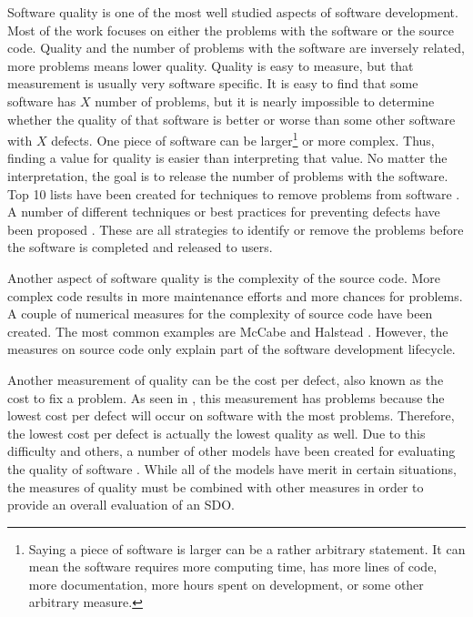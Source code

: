 \documentclass[SDSUThesis.tex]{subfiles}
\begin{document}
    Software quality is one of the most well studied aspects
    of software development.  Most of the work focuses on
    either the problems with the software or the source code.
    Quality and the number of problems with the software
    are inversely related, more problems means lower quality. 
    Quality is easy to measure, but 
    that measurement is usually very software specific.  It is easy
    to find that some software has $X$ number of problems, but
    it is nearly impossible to determine whether the quality
    of that software is better or worse than some other software
    with $X$ defects.  One piece of software can be 
    larger\footnote{Saying a piece of software is larger can be a 
    rather arbitrary statement.  It can mean the software requires 
    more computing time, has more lines of code, more documentation, 
    more hours spent on development, or some other arbitrary measure.}
    or more complex.  Thus, finding a value for quality is easier 
    than interpreting that value.  No matter the interpretation,
    the goal is to release the number of problems with the software.
    Top 10 lists have been created for techniques to remove problems
    from software \cite{Boehm2001}.  
    A number of different techniques or best practices
    for preventing defects have 
    been proposed \cite{Faizan2012}.  These are all strategies to identify
    or remove the problems before the software is completed and released
    to users.  
    
    Another aspect of software quality is the complexity of the 
    source code.  More complex code results in more maintenance efforts and
    more chances for problems. A couple of numerical measures for the 
    complexity of source code have been created.  The most common examples
    are McCabe \cite{McCabe1976} and Halstead \cite{Halstead1977}.
    However, the measures on source code only explain part of the 
    software development lifecycle.  
    
    Another measurement of quality can be the cost per defect, also 
    known as the cost to fix a problem.  As seen in \cite{Jones2013},
    this measurement has problems because the lowest cost per
    defect will occur on software with the most problems.  Therefore,
    the lowest cost per defect is actually the lowest quality as well.
    Due to this difficulty and others, a number of other models
    have been created for evaluating the quality of software 
    \cite{Miguel2014}.  While all of the models have merit
    in certain situations, the measures of quality must be combined
    with other measures in order to provide an overall evaluation
    of an SDO.
    
\end{document}
